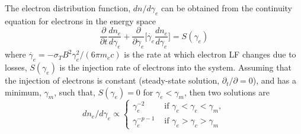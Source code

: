 %
%
The electron distribution function, $dn/d\gamma_e$ can be obtained from 
the continuity equation for electrons in the energy space 
%
\begin{equation}
\frac{\partial }{\partial t}\frac{d n_e}{d\gamma_e} + \frac{\partial}{\partial \gamma_e}\Big[ \dot{\gamma_e}\frac{dn_e}{d\gamma_e} \Big] = S(\gamma_e)
\end{equation}
%
where $\dot{\gamma_e} = -\sigma_T B^2 \gamma_e^2 / (6\pi m_e c)$ is the rate at 
which electron \ac{LF} changes due to losses, $S(\gamma_e)$ is the injection 
rate of electrons into the system.
%
Assuming that the injection of electrons is constant (steady-state solution,
$\partial_t/\partial = 0$), and has a minimum, $\gamma_m$, such that, 
$S(\gamma_e) = 0$ for $\gamma_e < \gamma_m$, then two solutions are 
%
\begin{equation}
dn_e/d\gamma_e \propto 
\begin{cases}
\gamma_e^{-2} &\text{ if } \gamma_c < \gamma_e < \gamma_m, \\
\gamma_e^{-p-1} &\text{ if } \gamma_e > \gamma_c > \gamma_m
\end{cases}
\label{eq:afterglow:elec_dist}
\end{equation}
